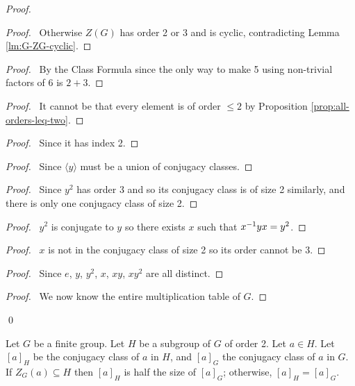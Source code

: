 \begin{proof}
\pf
{}
\begin{proof}
	\pf\ Otherwise $Z(G)$ has order 2 or 3 and is cyclic, contradicting Lemma \ref{lm:G-ZG-cyclic}.
\end{proof}
\begin{proof}
	\pf\ By the Class Formula since the only way to make 5 using non-trivial factors of 6 is $2+3$.
\end{proof}
\begin{proof}
	\pf\ It cannot be that every element is of order $\leq 2$ by Proposition \ref{prop:all-orders-leq-two}.
\end{proof}
\begin{proof}
	\pf\ Since it has index 2.
\end{proof}
\begin{proof}
	\pf\ Since $\langle y \rangle$ must be a union of conjugacy classes.
\end{proof}
\begin{proof}
	\pf\ Since $y^2$ has order 3 and so its conjugacy class is of size 2 similarly, and there is only one conjugacy class of size 2.
\end{proof}
\begin{proof}
	\pf\ $y^2$ is conjugate to $y$ so there exists $x$ such that ${x}^{-1}yx = y^2$.
\end{proof}
\begin{proof}
	\pf\ $x$ is not in the conjugacy class of size 2 so its order cannot be 3.
\end{proof}
\begin{proof}
	\pf\ Since $e$, $y$, $y^2$, $x$, $xy$, $xy^2$ are all distinct.
\end{proof}
\begin{proof}
	\pf\ We now know the entire multiplication table of $G$.
\end{proof}
\qed
\end{proof}

\begin{prop}
Let $G$ be a finite group. Let $H$ be a subgroup of $G$ of order 2. Let $a \in H$. Let $[a]_H$ be the conjugacy class of $a$ in $H$, and $[a]_G$ the conjugacy class of $a$ in $G$. If $Z_G(a) \subseteq H$ then $[a]_H$ is half the size of $[a]_G$; otherwise, $[a]_H = [a]_G$.
\end{prop}

